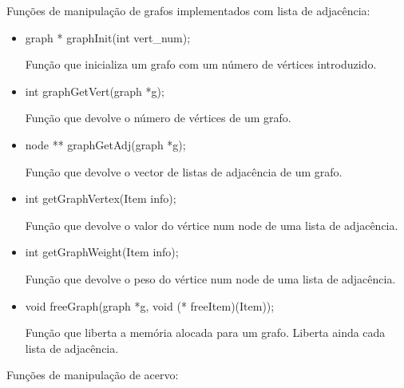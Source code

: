\documentclass[a4paper, 11pt]{article}
\begin{document}
    \par Funções de manipulação de grafos implementados com lista de adjacência:
    \begin{itemize}  
    \item graph * graphInit(int vert{\_}num);
    \par Função que inicializa um grafo com um número de vértices introduzido. 
    
    \item int graphGetVert(graph *g);
    \par Função que devolve o número de vértices de um grafo.
    
    \item node ** graphGetAdj(graph *g);
    \par Função que devolve o vector de listas de adjacência de um grafo.
    
    \item int getGraphVertex(Item info);
    \par Função que devolve o valor do vértice num node de uma lista de adjacência.

    \item int getGraphWeight(Item info);
    \par Função que devolve o peso do vértice num node de uma lista de adjacência.
    
    \item void freeGraph(graph *g, void (* freeItem)(Item));
    \par Função que liberta a memória alocada para um grafo. Liberta ainda cada lista de adjacência.


    \end{itemize}
    \par Funções de manipulação de acervo:
\end{document}
